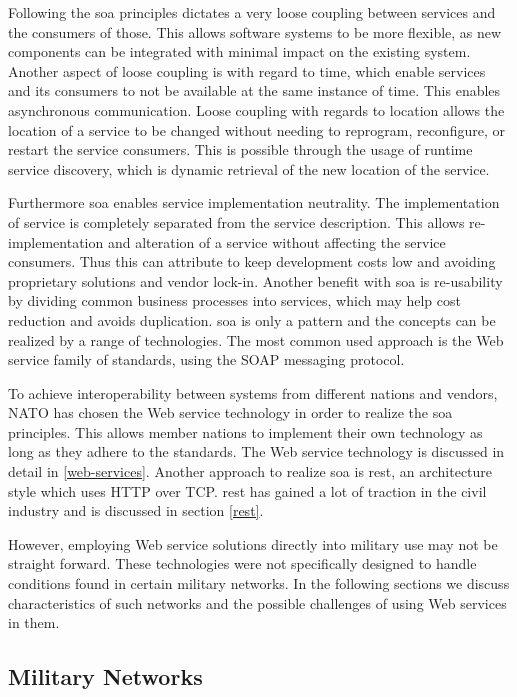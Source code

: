 Following the \gls{soa} principles dictates a very loose coupling between
services and the consumers of those. This allows software systems to be more
flexible, as new components can be integrated with minimal impact on the
existing system. Another aspect of loose coupling is with regard to time, which
enable services and its consumers to not be available at the same instance of
time. This enables asynchronous communication. Loose coupling with regards to
location allows the location of a service to be changed without needing to
reprogram, reconfigure, or restart the service consumers. This is possible
through the usage of runtime service discovery, which is dynamic retrieval of
the new location of the service.

Furthermore \gls{soa} enables service implementation neutrality. The
implementation of service is completely separated from the service
description. This allows re-implementation and alteration of a service without
affecting the service consumers. Thus this can attribute to keep development
costs low and avoiding proprietary solutions and vendor lock-in. Another
benefit with \gls{soa} is re-usability by dividing common business processes
into services, which may help cost reduction and avoids duplication. \gls{soa}
is only a pattern and the concepts can be realized by a range of technologies.
The most common used approach is the Web service family of standards, using
the SOAP messaging protocol.

To achieve interoperability between systems from different nations and vendors,
NATO has chosen the Web service technology in order to realize the \gls{soa}
principles\cite{soa-baseline}. This allows member nations to implement their own
technology as long as they adhere to the standards. The Web service technology
is discussed in detail in \cref{web-services}. Another approach to realize
\gls{soa} is \gls{rest}, an architecture style which uses HTTP over TCP.
\gls{rest} has gained a lot of traction in the civil industry and is discussed
in section \cref{rest}.

However, employing Web service solutions directly into military use may not be
straight forward. These technologies were not specifically designed to handle
conditions found in certain military networks. In the following sections we
discuss characteristics of such networks and the possible challenges of using
Web services in them.

\subsection{Military Networks}

